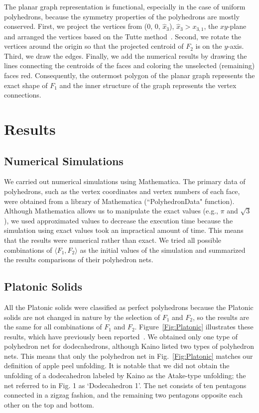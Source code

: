 \documentclass[]{interact}
\theoremstyle{plain}%
\theoremstyle{definition}
\theoremstyle{remark}
\begin{document}
The planar graph representation is functional, especially in the case of uniform polyhedrons, because the symmetry properties of the polyhedrons are mostly conserved. First, we project the vertices from (0, 0, $\hat{x}_3$), $\hat{x}_3>x_{3,1}$, the $xy$-plane and arranged the vertices based on the Tutte method~\citep{Tutte}. Second, we rotate the vertices around the origin so that the projected centroid of $F_2$ is on the $y$-axis. Third, we draw the edges. Finally, we add the numerical results by drawing the lines connecting the centroids of the faces and coloring the unselected (remaining) faces red. Consequently, the outermost polygon of the planar graph represents the exact shape of $F_1$ and the inner structure of the graph represents the vertex connections. 

\section{Results}\label{sec:results}
\subsection{Numerical Simulations}
We carried out numerical simulations using Mathematica\texttrademark. The primary data of polyhedrons, such as the vertex coordinates and vertex numbers of each face, were obtained from a library of Mathematica (``PolyhedronData" function). 
Although Mathematica allows us to manipulate the exact values (e.g., $\pi$ and $\sqrt{3}$), we used approximated values to decrease the execution time because the simulation using exact values took an impractical amount of time. This means that the results were numerical rather than exact. 
We tried all possible combinations of $\langle F_1, F_2\rangle$ as the initial values of the simulation and summarized the results comparisons of their polyhedron nets. 


\subsection{Platonic Solids}\label{platonic-solids}

All the Platonic solids were classified as perfect polyhedrons because the Platonic solids are not changed in nature by the selection of $F_1$ and $F_2$, so the results are the same for all combinations of $F_1$ and $F_2$. Figure~\ref{Fig:Platonic} illustrates these results, which have previously been reported~\cite[e.g.,][]{Kaino2019}. We obtained only one type
of polyhedron net for dodecahedrons, although Kaino listed two types of polyhedron
nets. This means that only the polyhedron net in Fig.~\ref{Fig:Platonic} matches our
definition of apple peel unfolding. It is notable that we did not obtain the unfolding of a dodecahedron labeled by Kaino as the Atake-type unfolding; the net referred to  in Fig. 1 as  `Dodecahedron 1'. The net consists of ten pentagons connected in a zigzag fashion, and the remaining two pentagons opposite each other on the top and bottom.
\end{document}
